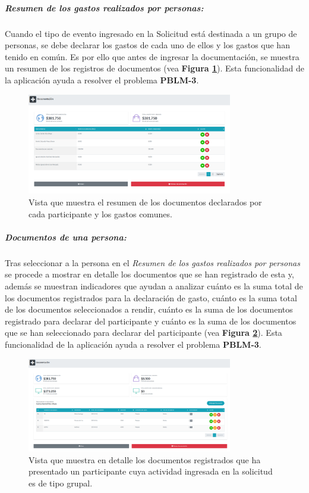     \subparagraph{\emph{Resumen de los gastos realizados por personas: }} Cuando el tipo de evento ingresado en la Solicitud está destinada a un grupo de personas, se debe declarar los gastos de cada uno de ellos y los gastos que han tenido en común. Es por ello que antes de ingresar la documentación, se muestra un resumen de los registros de documentos (vea \textbf{Figura \ref{fig: RendicionPersonas}}). Esta funcionalidad de la aplicación ayuda a resolver el problema \textbf{PBLM-3}.

    \begin{figure}[htbp]
        \centering
        \includegraphics[width= 0.8\textwidth]{Imagenes/Rendicion_Personas2.PNG}
        \caption{\label{fig: RendicionPersonas}Vista que muestra el resumen de los documentos declarados por cada participante y los gastos comunes.}
    \end{figure}

    \subparagraph{\emph{Documentos de una persona: }} Tras seleccionar a la persona en el \textit{Resumen de los gastos realizados por personas} se procede a mostrar en detalle los documentos que se han registrado de esta y, además se muestran indicadores que ayudan a analizar cuánto es la suma total de los documentos registrados para la declaración de gasto, cuánto es la suma total de los documentos seleccionados a rendir, cuánto es la suma de los documentos registrado para declarar del participante y cuánto es la suma de los documentos que se han seleccionado para declarar del participante (vea \textbf{Figura \ref{fig: DocumentosParticipante}}). Esta funcionalidad de la aplicación ayuda a resolver el problema \textbf{PBLM-3}.

    
    \begin{figure}[htbp]
        \centering
        \includegraphics[width= 0.8\textwidth]{Imagenes/Boletas_de_un_participante.PNG}
        \caption{\label{fig: DocumentosParticipante}Vista que muestra en detalle los documentos registrados que ha presentado un participante cuya actividad ingresada en la solicitud es de tipo grupal.}
    \end{figure}

